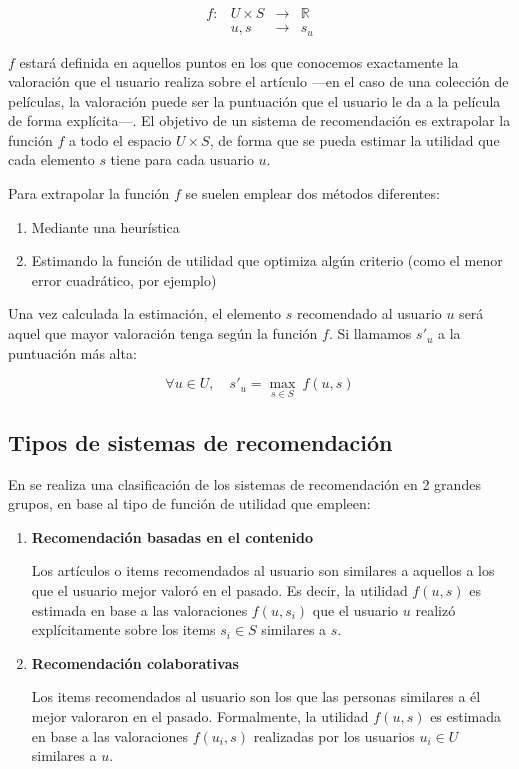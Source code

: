 $$
\begin{array}{rccc}
f: & U \times S & \longrightarrow & \mathbb{R}\\
   & u, s & \longrightarrow & s_u
\end{array}
$$

$f$ estará definida en aquellos puntos en los que conocemos exactamente la valoración que el usuario realiza sobre el artículo ---en el caso de una colección de películas, la valoración puede ser la puntuación que el usuario le da a la película de forma explícita---. El objetivo de un sistema de recomendación es extrapolar la función $f$ a todo el espacio $U \times S$, de forma que se pueda estimar la utilidad que cada elemento $s$ tiene para cada usuario $u$.

Para extrapolar la función $f$ se suelen emplear dos métodos diferentes:

\begin{enumerate}
\item Mediante una heurística
\item Estimando la función de utilidad que optimiza algún criterio (como el menor error cuadrático, por ejemplo)
\end{enumerate}

Una vez calculada la estimación, el elemento $s$ recomendado al usuario $u$ será aquel que mayor valoración tenga según la función $f$. Si llamamos $s'_u$ a la puntuación más alta:

$$
\forall u \in U,\quad s'_u = \max_{s \in S}\ f(u,s)
$$

\subsection{Tipos de sistemas de recomendación}

En \cite{adomavicius} se realiza una clasificación de los sistemas de recomendación en 2 grandes grupos, en base al tipo de función de utilidad que empleen:

\begin{enumerate}

\item {\bf Recomendación basadas en el contenido}

Los artículos o items recomendados al usuario son similares a aquellos a los que el usuario mejor valoró en el pasado. Es decir, la utilidad $f(u,s)$ es estimada en base a las valoraciones $f(u,s_i)$ que el usuario $u$ realizó explícitamente sobre los items $s_i \in S$ similares a $s$.

\item {\bf Recomendación colaborativas}

Los items recomendados al usuario son los que las personas similares a él mejor valoraron en el pasado. Formalmente, la utilidad $f(u,s)$ es estimada en base a las valoraciones $f(u_i,s)$ realizadas por los usuarios $u_i \in U$ similares a $u$.
\end{enumerate}


